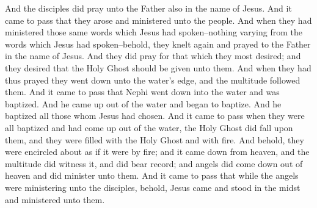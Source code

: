 And the disciples did pray unto the Father also in the name of Jesus. And it came to pass that they arose and ministered unto the people.
\bverse \iffalse And when they had ministered those same words which Jesus had spoken--nothing varying from the words which Jesus had spoken--behold, they knelt again and prayed to the Father in the name of Jesus. \fi
And when they had ministered those same words which Jesus had spoken--nothing varying from the words which Jesus had spoken--behold, they knelt again and prayed to the Father in the name of Jesus.
\bverse \iffalse And they did pray for that which they most desired; and they desired that the Holy Ghost should be given unto them. \fi
And they did pray for that which they most desired; and they desired that the Holy Ghost should be given unto them.
\bverse \iffalse And when they had thus prayed they went down unto the water's edge, and the multitude followed them. \fi
And when they had thus prayed they went down unto the water's edge, and the multitude followed them.
\bverse \iffalse And it came to pass that Nephi went down into the water and was baptized. \fi
And it came to pass that Nephi went down into the water and was baptized.
\bverse \iffalse And he came up out of the water and began to baptize. And he baptized all those whom Jesus had chosen. \fi
And he came up out of the water and began to baptize. And he baptized all those whom Jesus had chosen.
\bverse \iffalse And it came to pass when they were all baptized and had come up out of the water, the Holy Ghost did fall upon them, and they were filled with the Holy Ghost and with fire. \fi
And it came to pass when they were all baptized and had come up out of the water, the Holy Ghost did fall upon them, and they were filled with the Holy Ghost and with fire.
\bverse \iffalse And behold, they were encircled about as if it were by fire; and it came down from heaven, and the multitude did witness it, and did bear record; and angels did come down out of heaven and did minister unto them. \fi
And behold, they were encircled about as if it were by fire; and it came down from heaven, and the multitude did witness it, and did bear record; and angels did come down out of heaven and did minister unto them.
\bverse \iffalse And it came to pass that while the angels were ministering unto the disciples, behold, Jesus came and stood in the midst and ministered unto them. \fi
And it came to pass that while the angels were ministering unto the disciples, behold, Jesus came and stood in the midst and ministered unto them.

